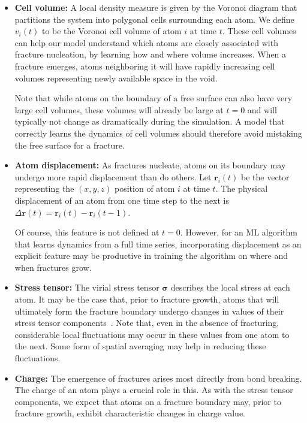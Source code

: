 \begin{itemize}
    
    \item \textbf{Cell volume:} A local density measure is given by the Voronoi diagram that partitions the system into polygonal cells surrounding each atom.  We define $v_i(t)$ to be the Voronoi cell volume of atom $i$ at time $t$.  These cell volumes can help our model understand which atoms are closely associated with fracture nucleation, by learning how and where volume increases.  When a fracture emerges, atoms neighboring it will have rapidly increasing cell volumes representing newly available space in the void.
    
    Note that while atoms on the boundary of a free surface can also have very large cell volumes, these volumes will already be large at $t=0$ and will typically not change as dramatically during the simulation.  A model that correctly learns the dynamics of cell volumes should therefore avoid mistaking the free surface for a fracture.

    \item \textbf{Atom displacement:} As fractures nucleate, atoms on its boundary may undergo more rapid displacement than do others.  Let $\mathbf{r}_i(t)$ be the vector representing the $(x,y,z)$ position of atom $i$ at time $t$. The physical displacement of an atom from one time step to the next is $\Delta \mathbf{r}(t)=\mathbf{r}_i(t)-\mathbf{r}_i(t-1)$.
    
    Of course, this feature is not defined at $t=0$.  However, for an ML algorithm that learns dynamics from a full time series, incorporating displacement as an explicit feature may be productive in training the algorithm on where and when fractures grow.

    \item\textbf{Stress tensor:} The virial stress tensor $\boldsymbol{\sigma}$ describes the local stress at each atom.  It may be the case that, prior to fracture growth, atoms that will ultimately form the fracture boundary undergo changes in values of their stress tensor components~\cite{elastic_fracture}. Note that, even in the absence of fracturing, considerable local fluctuations may occur in these values from one atom to the next.  Some form of spatial averaging may help in reducing these fluctuations.

    \item\textbf{Charge:} The emergence of fractures arises most directly from bond breaking.  The charge of an atom plays a crucial role in this.  As with the stress tensor components, we expect that atoms on a fracture boundary may, prior to fracture growth, exhibit characteristic changes in charge value.
    

\end{itemize}
